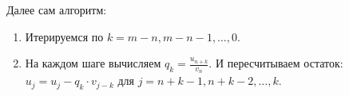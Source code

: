 Далее сам алгоритм:
\begin{enumerate}
  \item Итерируемся по $k = m - n, m - n - 1, \ldots, 0$.
  \item На каждом шаге вычисляем $q_{k} = \frac{u_{n + k}}{v_{n}}$. И пересчитываем остаток:
    $u_{j} = u_{j} - q_{k} \cdot v_{j - k}$ для $j = n + k - 1, n + k - 2, \ldots, k$.
\end{enumerate}

